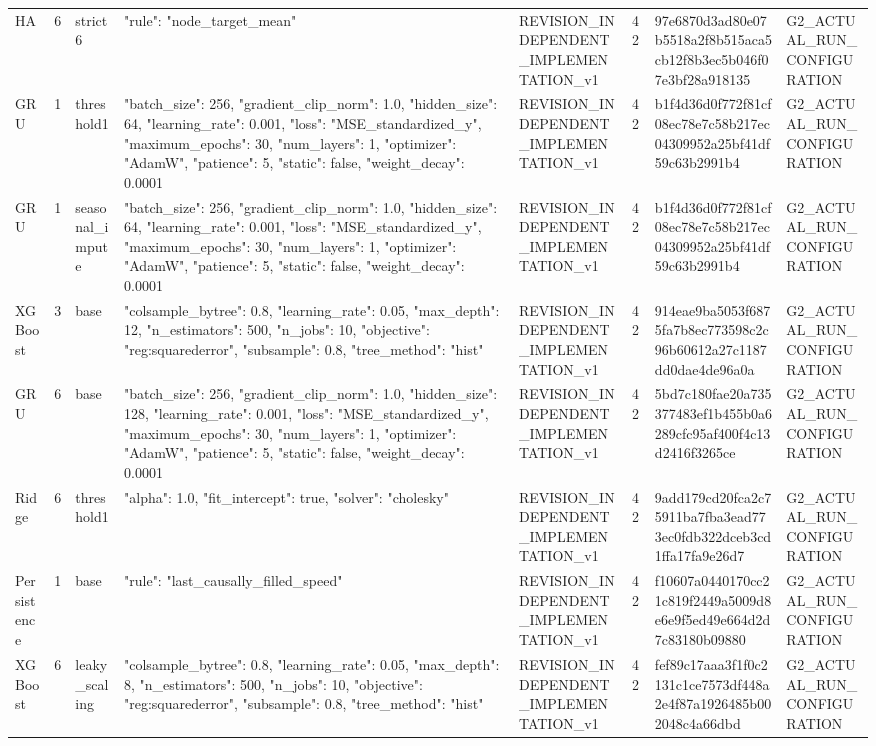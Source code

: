 \begin{longtable}{llllllll}
HA & 6 & strict6 & {"rule": "node\_target\_mean"} & REVISION\_INDEPENDENT\_IMPLEMENTATION\_v1 & 42 & 97e6870d3ad80e07b5518a2f8b515aca5cb12f8b3ec5b046f07e3bf28a918135 & G2\_ACTUAL\_RUN\_CONFIGURATION \\
GRU & 1 & threshold1 & {"batch\_size": 256, "gradient\_clip\_norm": 1.0, "hidden\_size": 64, "learning\_rate": 0.001, "loss": "MSE\_standardized\_y", "maximum\_epochs": 30, "num\_layers": 1, "optimizer": "AdamW", "patience": 5, "static": false, "weight\_decay": 0.0001} & REVISION\_INDEPENDENT\_IMPLEMENTATION\_v1 & 42 & b1f4d36d0f772f81cf08ec78e7c58b217ec04309952a25bf41df59c63b2991b4 & G2\_ACTUAL\_RUN\_CONFIGURATION \\
GRU & 1 & seasonal\_impute & {"batch\_size": 256, "gradient\_clip\_norm": 1.0, "hidden\_size": 64, "learning\_rate": 0.001, "loss": "MSE\_standardized\_y", "maximum\_epochs": 30, "num\_layers": 1, "optimizer": "AdamW", "patience": 5, "static": false, "weight\_decay": 0.0001} & REVISION\_INDEPENDENT\_IMPLEMENTATION\_v1 & 42 & b1f4d36d0f772f81cf08ec78e7c58b217ec04309952a25bf41df59c63b2991b4 & G2\_ACTUAL\_RUN\_CONFIGURATION \\
XGBoost & 3 & base & {"colsample\_bytree": 0.8, "learning\_rate": 0.05, "max\_depth": 12, "n\_estimators": 500, "n\_jobs": 10, "objective": "reg:squarederror", "subsample": 0.8, "tree\_method": "hist"} & REVISION\_INDEPENDENT\_IMPLEMENTATION\_v1 & 42 & 914eae9ba5053f6875fa7b8ec773598c2c96b60612a27c1187dd0dae4de96a0a & G2\_ACTUAL\_RUN\_CONFIGURATION \\
GRU & 6 & base & {"batch\_size": 256, "gradient\_clip\_norm": 1.0, "hidden\_size": 128, "learning\_rate": 0.001, "loss": "MSE\_standardized\_y", "maximum\_epochs": 30, "num\_layers": 1, "optimizer": "AdamW", "patience": 5, "static": false, "weight\_decay": 0.0001} & REVISION\_INDEPENDENT\_IMPLEMENTATION\_v1 & 42 & 5bd7c180fae20a735377483ef1b455b0a6289cfc95af400f4c13d2416f3265ce & G2\_ACTUAL\_RUN\_CONFIGURATION \\
Ridge & 6 & threshold1 & {"alpha": 1.0, "fit\_intercept": true, "solver": "cholesky"} & REVISION\_INDEPENDENT\_IMPLEMENTATION\_v1 & 42 & 9add179cd20fca2c75911ba7fba3ead773ec0fdb322dceb3cd1ffa17fa9e26d7 & G2\_ACTUAL\_RUN\_CONFIGURATION \\
Persistence & 1 & base & {"rule": "last\_causally\_filled\_speed"} & REVISION\_INDEPENDENT\_IMPLEMENTATION\_v1 & 42 & f10607a0440170cc21c819f2449a5009d8e6e9f5ed49e664d2d7c83180b09880 & G2\_ACTUAL\_RUN\_CONFIGURATION \\
XGBoost & 6 & leaky\_scaling & {"colsample\_bytree": 0.8, "learning\_rate": 0.05, "max\_depth": 8, "n\_estimators": 500, "n\_jobs": 10, "objective": "reg:squarederror", "subsample": 0.8, "tree\_method": "hist"} & REVISION\_INDEPENDENT\_IMPLEMENTATION\_v1 & 42 & fef89c17aaa3f1f0c2131c1ce7573df448a2e4f87a1926485b002048c4a66dbd & G2\_ACTUAL\_RUN\_CONFIGURATION \\

\end{longtable}
